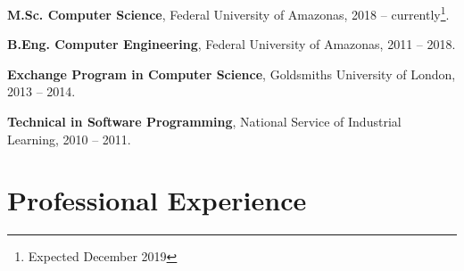 \documentclass[letterpaper]{article}
\renewenvironment{itemize}{
  \begin{list}{}{
    \setlength{\leftmargin}{1.5em}
  }
}{
  \end{list}
}
\begin{document}
\begin{itemize}
  \item {\bf M.Sc. Computer Science}, Federal University of Amazonas, 2018 -- currently\footnote{Expected December 2019}.
  
  \item {\bf B.Eng. Computer Engineering}, Federal University of Amazonas, 2011 -- 2018.

  \item {\bf Exchange Program in Computer Science}, Goldsmiths University of London, 2013 -- 2014.

  \item {\bf Technical in Software Programming}, National Service of Industrial Learning, 2010 -- 2011.
\end{itemize}


\section*{Professional Experience}
\end{document}
